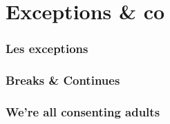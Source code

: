 \documentclass{beamer}
\begin{document}
\section{Exceptions \& co}
\label{sec:except}

\begin{frame}
  \frametitle{Les exceptions}
\end{frame}

\begin{frame}
  \frametitle{Breaks \& Continues}
\end{frame}

\begin{frame}
  \frametitle{We're all consenting adults}

\end{frame}
\end{document}
